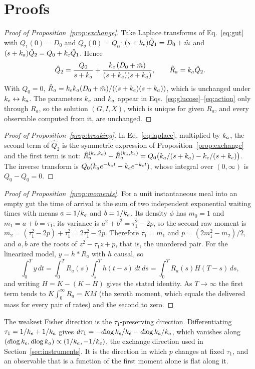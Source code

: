 \section{Proofs}
\label{app:proofs}

\begin{proof}[Proof of Proposition~\ref{prop:exchange}]
Take Laplace transforms of Eq.~\eqref{eq:gut} with $Q_1(0)=D_0$ and $Q_2(0)=Q_0$:
$(s+k_e)\hat Q_1=D_0+\hat m$ and $(s+k_a)\hat Q_2=Q_0+k_e\hat Q_1$. Hence
\begin{equation}
\hat Q_2=\frac{Q_0}{s+k_a}+\frac{k_e\,(D_0+\hat m)}{(s+k_e)(s+k_a)},\qquad \hat R_a=k_a\hat Q_2.
\label{eq:laplace}
\end{equation}
With $Q_0=0$, $\hat R_a=k_ek_a(D_0+\hat m)/((s+k_e)(s+k_a))$, which is unchanged under $k_e\leftrightarrow k_a$.
The parameters $k_e$ and $k_a$ appear in Eqs.~\eqref{eq:glucose}--\eqref{eq:action} only through $R_a$, so
the solution $(G,I,X)$, which is unique for given $R_a$, and every observable computed from it, are unchanged.
\end{proof}

\begin{proof}[Proof of Proposition~\ref{prop:breaking}]
In Eq.~\eqref{eq:laplace}, multiplied by $k_a$, the second term of $\hat Q_2$ is the symmetric expression of
Proposition~\ref{prop:exchange} and the first term is not: $\hat R_a^{(k_e,k_a)}-\hat R_a^{(k_a,k_e)}=Q_0\bigl(k_a/(s+k_a)-k_e/(s+k_e)\bigr)$.
The inverse transform is $Q_0(k_a e^{-k_a t}-k_e e^{-k_e t})$, whose integral over $(0,\infty)$ is $Q_0-Q_0=0$.
\end{proof}

\begin{proof}[Proof of Proposition~\ref{prop:moments}]
For a unit instantaneous meal into an empty gut the time of arrival is the sum of two independent
exponential waiting times with means $a=1/k_e$ and $b=1/k_a$. Its density $\phi$ has $m_0=1$ and
$m_1=a+b=\tau_1$; its variance is $a^2+b^2=\tau_1^2-2p$, so the second raw moment is
$m_2=(\tau_1^2-2p)+\tau_1^2=2\tau_1^2-2p$. Therefore $\tau_1=m_1$ and $p=(2m_1^2-m_2)/2$, and $a,b$ are the roots of
$z^2-\tau_1z+p$, that is, the unordered pair. For the linearized model, $y=h*R_a$ with $h$ causal, so
\begin{equation}
\int_0^Ty\,dt=\int_0^T R_a(s)\int_s^T h(t-s)\,dt\,ds=\int_0^T R_a(s)H(T-s)\,ds,
\end{equation}
and writing $H=K-(K-H)$ gives the stated identity. As $T\to\infty$ the first term tends to
$K\!\int_0^\infty R_a=KM$ (the zeroth moment, which equals the delivered mass for every pair of rates) and
the second to zero.
\end{proof}

\begin{remark}
The weakest Fisher direction is the $\tau_1$-preserving direction. Differentiating
$\tau_1=1/k_e+1/k_a$ gives $d\tau_1=-d\!\log k_e/k_e-d\!\log k_a/k_a$, which vanishes along
$(d\!\log k_e,d\!\log k_a)\propto(1/k_a,-1/k_e)$, the exchange direction used in Section~\ref{sec:instruments}.
It is the direction in which $p$ changes at fixed $\tau_1$, and an observable that is a function of the
first moment alone is flat along it.
\end{remark}
